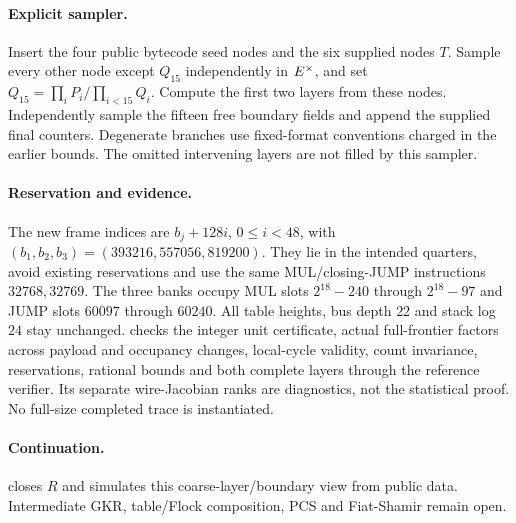 \documentclass[11pt]{article}
\begin{document}
\paragraph{Explicit sampler.} Insert the four public bytecode seed nodes and the six supplied nodes $T$. Sample every other node except $Q_{15}$ independently in $E^\times$, and set $Q_{15}=\prod_iP_i/\prod_{i<15}Q_i$. Compute the first two layers from these nodes. Independently sample the fifteen free boundary fields and append the supplied final counters. Degenerate branches use fixed-format conventions charged in the earlier bounds. The omitted intervening layers are not filled by this sampler.

\paragraph{Reservation and evidence.} The new frame indices are $b_j+128i$, $0\le i<48$, with $(b_1,b_2,b_3)=(393216,557056,819200)$. They lie in the intended quarters, avoid existing reservations and use the same MUL/closing-JUMP instructions $32768,32769$. The three banks occupy MUL slots $2^{18}-240$ through $2^{18}-97$ and JUMP slots $60097$ through $60240$. All table heights, bus depth $22$ and stack log $24$ stay unchanged.  checks the integer unit certificate, actual full-frontier factors across payload and occupancy changes, local-cycle validity, count invariance, reservations, rational bounds and both complete layers through the reference verifier. Its separate wire-Jacobian ranks are diagnostics, not the statistical proof. No full-size completed trace is instantiated.

\paragraph{Continuation.}  closes $R$ and simulates this coarse-layer/boundary view from public data. Intermediate GKR, table/Flock composition, PCS and Fiat-Shamir remain open.
\end{document}
